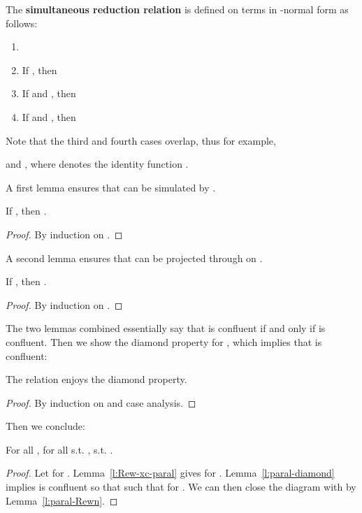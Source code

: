 \documentclass{LMCS}
\renewcommand{\>}{\rightarrow}
\newcommand{\deft}[1]{{\bf #1}}
\begin{document}
The \deft{simultaneous reduction relation } is defined on terms in -normal form as follows:
\begin{enumerate}[]
\item 
\item If , then 
\item If  and , then 
\item If  and
         , then 
\end{enumerate}
Note that the third and fourth cases overlap, thus for example,

and , where  denotes the identity
function .

 A first lemma ensures that  can be simulated by .

\begin{lem}
\label{l:paral-Rewn}
If , then . 
\end{lem}

\begin{proof}
By induction on . 
\end{proof}

A second lemma ensures that  can be projected through  on .

\begin{lem}
\label{l:Rew-xc-paral}
If , then . 
\end{lem}

\begin{proof}
By induction on .
\end{proof}

The two lemmas combined essentially say that  is
confluent if and only if  is confluent. Then we show the
diamond property for , which implies that
 is confluent:

\begin{lem}
\label{l:paral-diamond}
The relation  enjoys the diamond property.
\end{lem}

\begin{proof}
By induction on  and case analysis.
\end{proof}

Then we conclude:

\begin{thm}[Confluence]
\label{t:confluence}
For all , for all  s.t. ,
 s.t. . 
\end{thm}

\begin{proof}
Let  for . Lemma~\ref{l:Rew-xc-paral}
gives  for . Lemma~\ref{l:paral-diamond}
implies  is confluent so that  such that
 for . We can then close the diagram
with  by Lemma~\ref{l:paral-Rewn}.
\end{proof}
\end{document}
